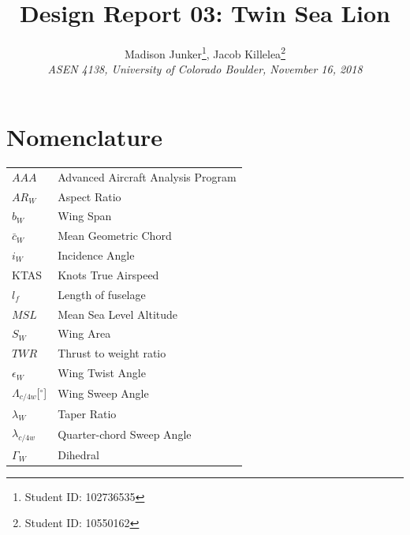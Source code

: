 \documentclass[conf]{new-aiaa}
\title{Design Report 03: Twin Sea Lion}
\author{
    Madison Junker\footnote{Student ID: 102736535 }, Jacob Killelea\footnote{Student ID: 10550162 } \\
    \emph{ASEN 4138, University of Colorado Boulder, November 16, 2018}
}
\begin{document}
\clearpage
\maketitle
\thispagestyle{empty}

\newpage
{}
\tableofcontents
{}
\listoffigures
{}
\listoftables
\newpage
\printnomenclature[25mm]

\section*{Nomenclature}

{\renewcommand\arraystretch{1.0}
\noindent\begin{longtable*}{@{}l @{\quad=\quad} l@{}}
$AAA$     	               & Advanced Aircraft Analysis Program \\
$AR_W$    	               & Aspect Ratio                       \\
$b_W$	  	               & Wing Span                          \\
$\bar{c}_W$	  	           & Mean Geometric Chord               \\
$i_W$		               & Incidence Angle                    \\
KTAS                       & Knots True Airspeed                \\
$l_f$     	               & Length of fuselage                 \\
$MSL$     	               & Mean Sea Level Altitude            \\
$S_W$     	               & Wing Area                          \\
$TWR$     	               & Thrust to weight ratio             \\
$\epsilon_W$               & Wing Twist Angle                   \\
$\Lambda_{c/4w}$[$^\circ$] & Wing Sweep Angle                   \\
$\lambda_W$	               & Taper Ratio                        \\
$\lambda_{c/4w}$           & Quarter-chord Sweep Angle          \\
$\Gamma_W$	               & Dihedral                           \\
\end{longtable*}}

\newpage
{}
\end{document}
